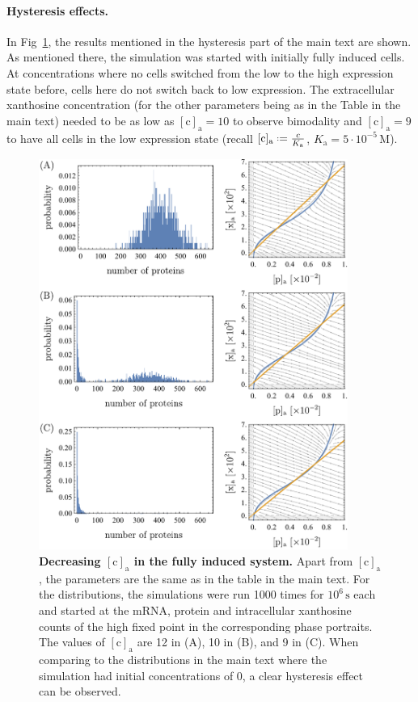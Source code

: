 \documentclass[10pt,letterpaper]{article}
\newcommand{\unit}[1]{\,\mathrm{#1}}
\newcommand{\n}[1]{\mathrm{#1}}
\newcommand*{\defeq}{\mathrel{\vcenter{\baselineskip0.5ex \lineskiplimit0pt
			\hbox{\scriptsize.}\hbox{\scriptsize.}}}%
	=}
\begin{document}
\paragraph*{Hysteresis effects.}
In Fig~\ref{figS8:hysteresis}, the results mentioned in the hysteresis part of the main text are shown. As mentioned there,  the simulation was started with initially fully induced cells. At concentrations where no cells switched from the low to the high expression state before, cells here do not switch back to low expression. The extracellular xanthosine concentration (for the other parameters being as in the Table in the main text) needed to be as low as $\n{[c]_a} = 10$ to observe bimodality and $\n{[c]_a}=9$ to have all cells in the low expression state (recall $\n{[c]_{a}} \defeq \frac{c}{K_{\n{a}}}$, $K_{\n{a}} = 5 \cdot
10^{-5} \unit{M}$).

\begin{figure}
	\centering
	\includegraphics[width=0.9\textwidth]{FigSI8.pdf}
	\caption{{\bf Decreasing $\n{[c]_a}$ in the fully induced system.}
		Apart from $\n{[c]_a}$, the parameters are the same as in the table in the main text. For the distributions, the simulations were run 1000 times for $10^6 \unit{s}$ each and started at the mRNA, protein and intracellular xanthosine counts of the high fixed point in the corresponding phase portraits. The values of $\n{[c]_a}$ are 12 in (A), 10 in (B), and 9 in (C). When comparing to the distributions in the main text where the simulation had initial concentrations of 0, a clear hysteresis effect can be observed.}
	\label{figS8:hysteresis}
\end{figure}
\end{document}

